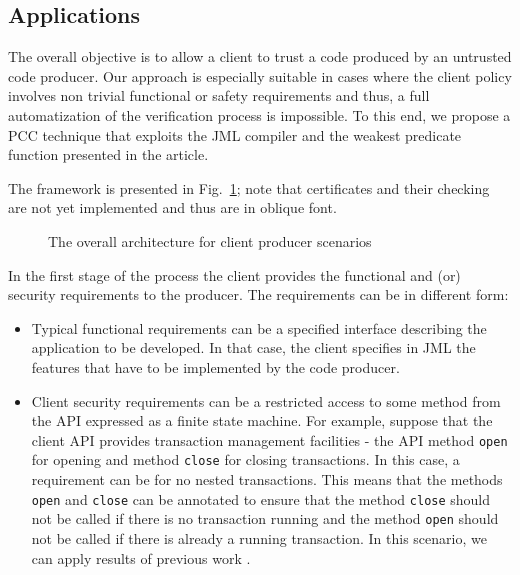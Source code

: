 
\subsection{Applications}
\label{architecture_s}	


The overall objective is to allow a client to trust a code produced by an untrusted code producer. Our approach is especially suitable
 in cases where the client policy involves non trivial functional or safety requirements and thus, a full automatization of the verification 
process is impossible. To this end, we propose a PCC technique that exploits the JML compiler and the weakest predicate function presented in the article. 
 
 The framework is presented in Fig.~\ref{architecture}; note that certificates and their checking are not yet implemented
 and thus are in oblique font.
  


 \begin{figure}[!tbp]
 \centering
{}
\caption{\sc The overall architecture for client producer scenarios }
\label{architecture}
\end{figure}

In the first stage of the process the client provides the functional and (or) security requirements to the producer.
 The requirements can be in different form:
\begin{itemize}
\item Typical functional requirements can be a specified interface describing the application to be developed. 
In that case, the client specifies in JML the features that have to be implemented by the code producer.
\item Client security requirements can be a restricted access to some method from the API expressed as a finite state machine.
For example, suppose that the client API provides transaction management facilities - the API method \texttt{open} for opening and method 
\texttt{close} for closing transactions. In this case, a requirement can be for no nested transactions.
This means that the methods \texttt{open} and \texttt{close} can be annotated to ensure that the method \texttt{close} 
 should not be called if there is no transaction running and the method \texttt{open} should not be called if there is already a running transaction. 
In this scenario, we can apply results of previous work \cite{m+04:cardis}.  
\end{itemize}

